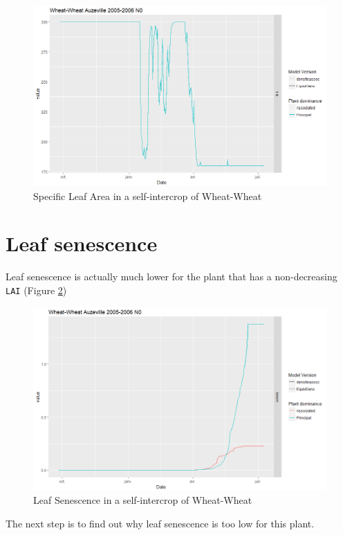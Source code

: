 \documentclass[
]{book}
\begin{document}
\begin{figure}
\centering
\includegraphics{img/LAI_hyp_SLA.png}
\caption{\label{fig:LAISLA}Specific Leaf Area in a self-intercrop of Wheat-Wheat}
\end{figure}

\hypertarget{leaf-senescence}{%
\section{Leaf senescence}\label{leaf-senescence}}

Leaf senescence is actually much lower for the plant that has a non-decreasing \texttt{LAI} (Figure \ref{fig:Leafsen})

\begin{figure}
\centering
\includegraphics{img/Senescence.png}
\caption{\label{fig:Leafsen}Leaf Senescence in a self-intercrop of Wheat-Wheat}
\end{figure}

The next step is to find out why leaf senescence is too low for this plant.
\end{document}
